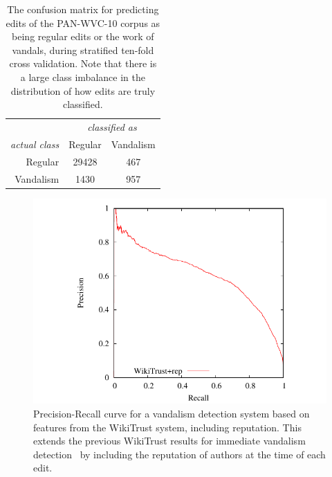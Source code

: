 \begin{table}[b!tph]
  \begin{center}
    \begin{tabular}{| r | c c |}
      \hline
          & \multicolumn{2}{c|}{\textit{classified as}} \\
      \textit{actual class} & Regular & Vandalism \\
          \cline{2-3}
      Regular & 29428 & 467 \\
      Vandalism & 1430 & 957 \\
      \hline
    \end{tabular}
  \end{center}
  \caption[Confusion matrix for vandalism prediction]{%
    The confusion matrix for predicting edits of the PAN-WVC-10
    corpus as being regular edits or the work of vandals,
    during stratified ten-fold cross validation.
    Note that there is a large class imbalance in the distribution
    of how edits are truly classified.}
  \label{tab:vandalrep-confusion}
\end{table}

\begin{figure}[tbhp]
  \centering
  \includegraphics{part-Q10-vandalism/graph-wikitrust-pr}
  \caption[Precision-Recall curve for vandalism detection]{%
    Precision-Recall curve for a vandalism detection system based
    on features from the WikiTrust system, including reputation.
    This extends the previous WikiTrust results for immediate vandalism
    detection~\cite{Adler2010b} by including the reputation of authors
    at the time of each edit.}
  \label{fig:vandalrep-prcurve}
\end{figure}

